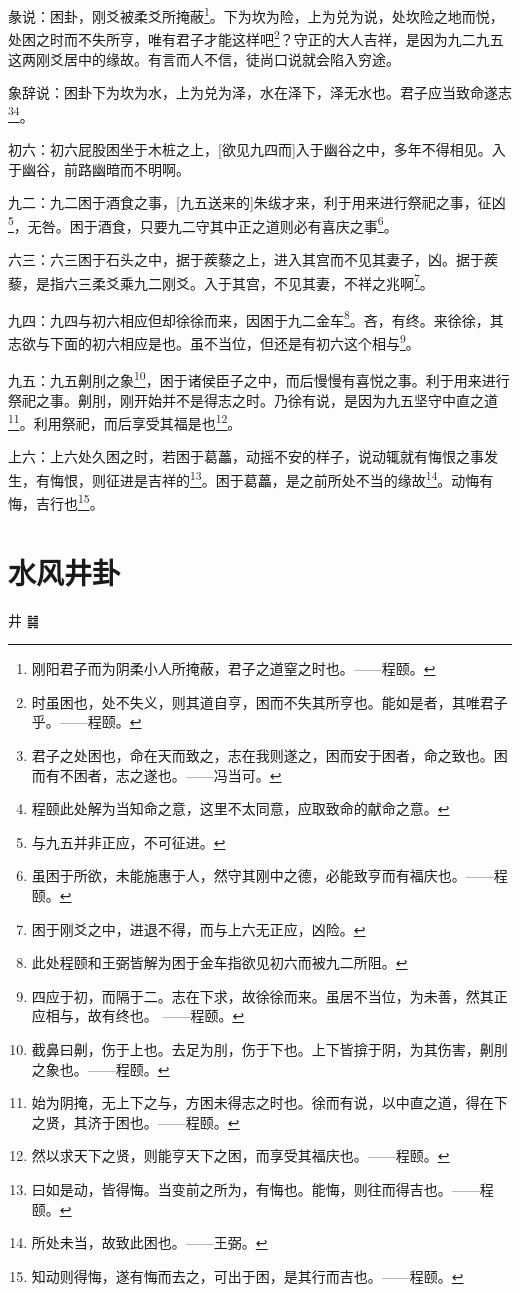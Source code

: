 \documentclass[12pt,oneside]{book}
\begin{document}
彖说：困卦，刚爻被柔爻所掩蔽\footnote{刚阳君子而为阴柔小人所掩蔽，君子之道窒之时也。——程颐。}。下为坎为险，上为兑为说，处坎险之地而悦，处困之时而不失所亨，唯有君子才能这样吧\footnote{时虽困也，处不失义，则其道自亨，困而不失其所亨也。能如是者，其唯君子乎。——程颐。}？守正的大人吉祥，是因为九二九五这两刚爻居中的缘故。有言而人不信，徒尚口说就会陷入穷途。

象辞说：困卦下为坎为水，上为兑为泽，水在泽下，泽无水也。君子应当致命遂志\footnote{君子之处困也，命在天而致之，志在我则遂之，困而安于困者，命之致也。困而有不困者，志之遂也。——冯当可。}\footnote{程颐此处解为当知命之意，这里不太同意，应取致命的献命之意。}。


初六：初六屁股困坐于木桩之上，[欲见九四而]入于幽谷之中，多年不得相见。入于幽谷，前路幽暗而不明啊。

九二：九二困于酒食之事，[九五送来的]朱绂才来，利于用来进行祭祀之事，征凶\footnote{与九五并非正应，不可征进。}，无咎。困于酒食，只要九二守其中正之道则必有喜庆之事\footnote{虽困于所欲，未能施惠于人，然守其刚中之德，必能致亨而有福庆也。——程颐。}。

六三：六三困于石头之中，据于蒺藜之上，进入其宫而不见其妻子，凶。据于蒺藜，是指六三柔爻乘九二刚爻。入于其宫，不见其妻，不祥之兆啊\footnote{困于刚爻之中，进退不得，而与上六无正应，凶险。}。

九四：九四与初六相应但却徐徐而来，因困于九二金车\footnote{此处程颐和王弼皆解为困于金车指欲见初六而被九二所阻。}。吝，有终。来徐徐，其志欲与下面的初六相应是也。虽不当位，但还是有初六这个相与\footnote{四应于初，而隔于二。志在下求，故徐徐而来。虽居不当位，为未善，然其正应相与，故有终也。 ——程颐。}。

九五：九五劓刖之象\footnote{截鼻曰劓，伤于上也。去足为刖，伤于下也。上下皆揜于阴，为其伤害，劓刖之象也。——程颐。}，困于诸侯臣子之中，而后慢慢有喜悦之事。利于用来进行祭祀之事。劓刖，刚开始并不是得志之时。乃徐有说，是因为九五坚守中直之道\footnote{始为阴掩，无上下之与，方困未得志之时也。徐而有说，以中直之道，得在下之贤，其济于困也。——程颐。}。利用祭祀，而后享受其福是也\footnote{然以求天下之贤，则能亨天下之困，而享受其福庆也。——程颐。}。

上六：上六处久困之时，若困于葛藟，动摇不安的样子，说动辄就有悔恨之事发生，有悔恨，则征进是吉祥的\footnote{曰如是动，皆得悔。当变前之所为，有悔也。能悔，则往而得吉也。——程颐。}。困于葛藟，是之前所处不当的缘故\footnote{所处未当，故致此困也。——王弼。}。动悔有悔，吉行也\footnote{知动则得悔，遂有悔而去之，可出于困，是其行而吉也。——程颐。}。


\chapter{水风井卦}
井 {\Large ䷯}
\end{document}
